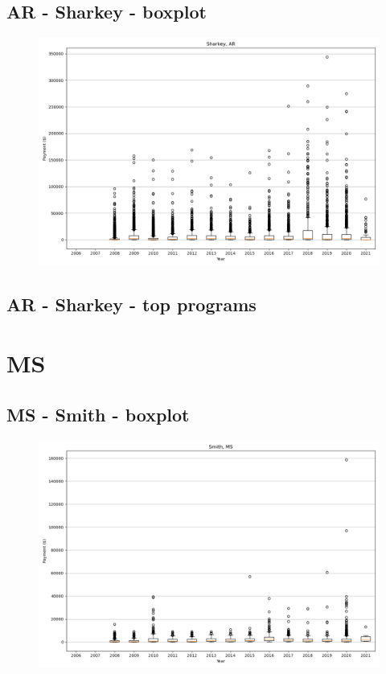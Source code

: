\subsection*{AR - Sharkey - boxplot}
\begin{figure}[h]
\centering
\includegraphics[width=7in]{../output/boxplots/counties/Sharkey-AR_boxplot.png}
\end{figure}


\subsection*{AR - Sharkey - top programs}

\newpage
\section*{MS}
\subsection*{MS - Smith - boxplot}
\begin{figure}[h]
\centering
\includegraphics[width=7in]{../output/boxplots/counties/Smith-MS_boxplot.png}
\end{figure}



